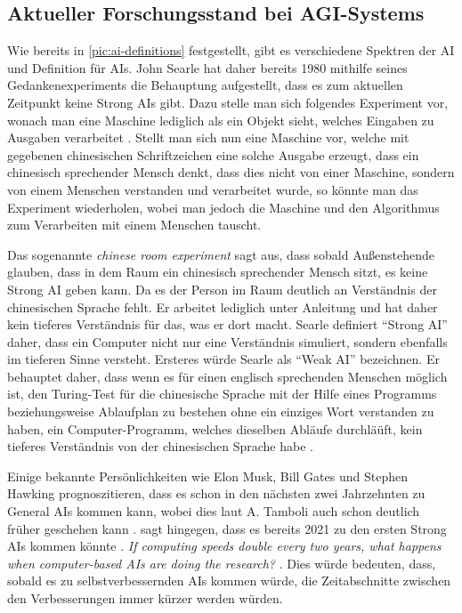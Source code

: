         \subsection{Aktueller Forschungsstand bei AGI-Systems}
            Wie bereits in \ref{pic:ai-definitions} festgestellt, gibt es verschiedene Spektren der AI und
            Definition für AIs. John Searle hat daher bereits 1980 mithilfe seines Gedankenexperiments die Behauptung
            aufgestellt, dass es zum aktuellen Zeitpunkt keine Strong AIs gibt. Dazu stelle man sich folgendes
            Experiment vor, wonach man eine Maschine lediglich als ein Objekt sieht, welches Eingaben zu
            Ausgaben verarbeitet \cite{cole_2014}. Stellt man sich nun eine Maschine vor, welche mit gegebenen
            chinesischen Schriftzeichen eine solche Ausgabe erzeugt, dass ein chinesisch sprechender Mensch denkt,
            dass dies nicht von einer Maschine, sondern von einem Menschen verstanden und verarbeitet wurde, so könnte
            man das Experiment wiederholen, wobei man jedoch die Maschine und den Algorithmus zum Verarbeiten mit einem
            Menschen tauscht.

            Das sogenannte \textit{chinese room experiment} sagt aus, dass sobald Außenstehende glauben,
            dass in dem Raum ein chinesisch sprechender Mensch sitzt, es keine Strong AI geben kann. Da es der Person im
            Raum deutlich an Verständnis der chinesischen Sprache fehlt. Er arbeitet lediglich unter
            Anleitung und hat daher kein tieferes Verständnis für das, was er dort macht. Searle definiert
            ``Strong AI'' daher, dass ein Computer nicht nur eine Verständnis simuliert, sondern ebenfalls im tieferen
            Sinne versteht. Ersteres würde Searle als ``Weak AI'' bezeichnen. \cite{cole_2014} Er behauptet daher, dass
            wenn es für einen englisch sprechenden Menschen möglich ist, den Turing-Test für die chinesische Sprache mit
            der Hilfe eines Programms beziehungsweise Ablaufplan zu bestehen ohne ein einziges Wort verstanden zu haben,
            ein Computer-Programm, welches dieselben Abläufe durchläüft, kein tieferes Verständnis von der chinesischen
            Sprache habe \cite{cole_2014}.

            Einige bekannte Persönlichkeiten wie Elon Musk, Bill Gates und Stephen Hawking prognoszitieren, dass es
            schon in den nächsten zwei Jahrzehnten zu General AIs kommen kann, wobei dies laut
            A. Tamboli auch schon deutlich früher geschehen kann \cite[s. 20]{Tamboli2019}. \citeauthor{yudkowsky_2001}
            sagt hingegen, dass es bereits 2021 zu den ersten Strong AIs kommen könnte \citeyearpar{yudkowsky_2001}.
            \textit{If computing speeds double every two years, what happens when computer-based AIs are doing the research?}
            \cite{yudkowsky_2001}. Dies würde bedeuten, dass, sobald es zu selbstverbessernden AIs kommen würde, die
            Zeitabschnitte zwischen den Verbesserungen immer kürzer werden würden.

